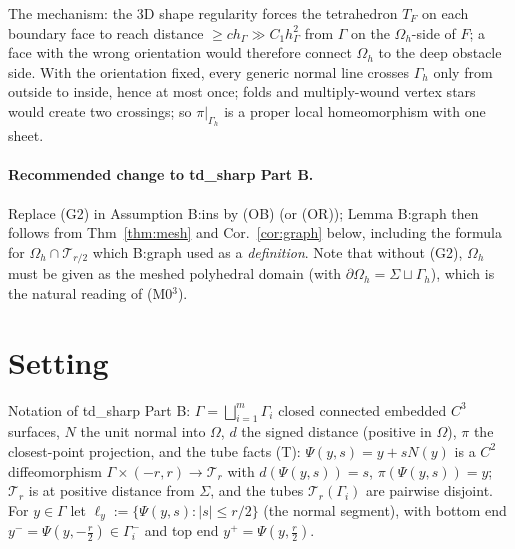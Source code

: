 \documentclass[11pt]{article}
\theoremstyle{definition}
\newcommand{\hG}{h_\Gamma}
\newcommand{\Gh}{\Gamma_h}
\newcommand{\Oh}{\Omega_h}
\begin{document}
The mechanism: the 3D shape regularity forces the tetrahedron $T_F$ on each boundary face to reach distance $\ge c\hG\gg C_1\hG^2$ from $\Gamma$ on the $\Oh$-side of $F$; a face with the wrong orientation would therefore connect $\Oh$ to the deep obstacle side. With the orientation fixed, every generic normal line crosses $\Gh$ only from outside to inside, hence at most once; folds and multiply-wound vertex stars would create two crossings; so $\pi|_{\Gh}$ is a proper local homeomorphism with one sheet.

\paragraph{Recommended change to td\_sharp Part B.} Replace (G2) in Assumption B:ins by (OB) (or (OR)); Lemma B:graph then follows from Thm~\ref{thm:mesh} and Cor.~\ref{cor:graph} below, including the formula for $\Oh\cap\mathcal T_{r/2}$ which B:graph used as a \emph{definition}. Note that without (G2), $\Oh$ must be given as the meshed polyhedral domain (with $\partial\Oh=\Sigma\sqcup\Gh$), which is the natural reading of (M0$^3$).

\section{Setting}
Notation of td\_sharp Part B: $\Gamma=\bigsqcup_{i=1}^m\Gamma_i$ closed connected embedded $C^3$ surfaces, $N$ the unit normal into $\Omega$, $d$ the signed distance (positive in $\Omega$), $\pi$ the closest-point projection, and the tube facts (T): $\Psi(y,s)=y+sN(y)$ is a $C^2$ diffeomorphism $\Gamma\times(-r,r)\to\mathcal T_r$ with $d(\Psi(y,s))=s$, $\pi(\Psi(y,s))=y$; $\mathcal T_r$ is at positive distance from $\Sigma$, and the tubes $\mathcal T_r(\Gamma_i)$ are pairwise disjoint. For $y\in\Gamma$ let $\ell_y:=\{\Psi(y,s):|s|\le r/2\}$ (the normal segment), with bottom end $y^-=\Psi(y,-\frac r2)\in\Gamma_i^-$ and top end $y^+=\Psi(y,\frac r2)$.
\end{document}

